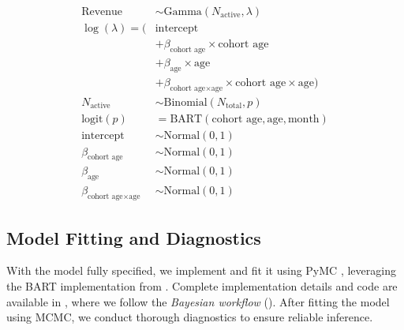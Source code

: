 \documentclass[11pt]{amsart}
\theoremstyle{definition}
\begin{document}
\begin{align*}
    \text{Revenue}                              & \sim \text{Gamma}(N_{\text{active}}, \lambda)                                             \\
    \log(\lambda) = (                           & \text{intercept}                                                                          \\
                                                & + \beta_{\text{cohort age}} \times \text{cohort age}                                      \\
                                                & + \beta_{\text{age}} \times \text{age}                                                    \\
                                                & + \beta_{\text{cohort age} \times \text{age}} \times \text{cohort age} \times \text{age}) \\
    N_{\text{active}}                           & \sim \text{Binomial}(N_{\text{total}}, p)                                                 \\
    \textrm{logit}(p)                           & = \text{BART}(\text{cohort age}, \text{age}, \text{month})                                \\
    \text{intercept}                            & \sim \text{Normal}(0, 1)                                                                  \\
    \beta_{\text{cohort age}}                   & \sim \text{Normal}(0, 1)                                                                  \\
    \beta_{\text{age}}                          & \sim \text{Normal}(0, 1)                                                                  \\
    \beta_{\text{cohort age} \times \text{age}} & \sim \text{Normal}(0, 1)
\end{align*}

\subsection{Model Fitting and Diagnostics}

With the model fully specified, we implement and fit it using PyMC \cite{pymc2023}, leveraging the BART implementation
from \cite{quiroga2022bart}. Complete implementation details and code are available in \cite{orduz_revenue_retention}, where
we follow the {\em Bayesian workflow} (\cite{gelman2020bayesianworkflow}). After fitting the model using MCMC, we conduct 
thorough diagnostics to ensure reliable inference. 
\end{document}
